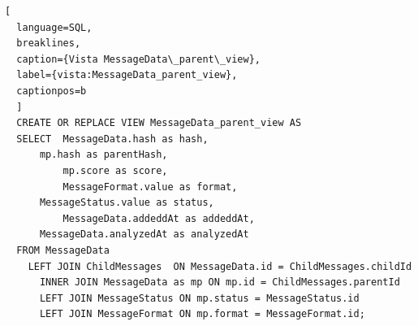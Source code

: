 \begin{lstlisting}[
  language=SQL,
  breaklines, 
  caption={Vista MessageData\_parent\_view}, 
  label={vista:MessageData_parent_view}, 
  captionpos=b
  ]
  CREATE OR REPLACE VIEW MessageData_parent_view AS 
  SELECT  MessageData.hash as hash,
      mp.hash as parentHash, 
          mp.score as score,
          MessageFormat.value as format,
      MessageStatus.value as status,
          MessageData.addeddAt as addeddAt,
      MessageData.analyzedAt as analyzedAt
  FROM MessageData 
    LEFT JOIN ChildMessages  ON MessageData.id = ChildMessages.childId
      INNER JOIN MessageData as mp ON mp.id = ChildMessages.parentId
      LEFT JOIN MessageStatus ON mp.status = MessageStatus.id
      LEFT JOIN MessageFormat ON mp.format = MessageFormat.id;
\end{lstlisting}
